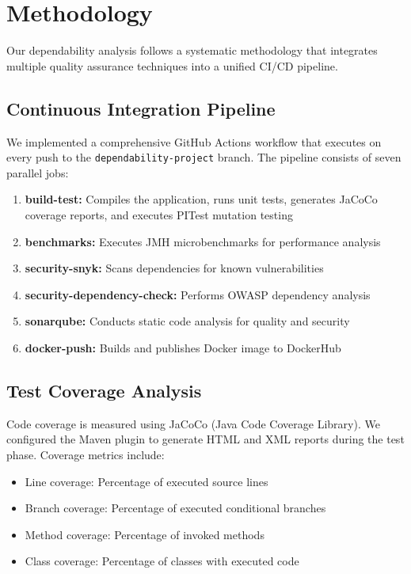 \documentclass[sigconf]{acmart}
\begin{document}
\section{Methodology}

Our dependability analysis follows a systematic methodology that integrates multiple quality assurance techniques into a unified CI/CD pipeline.

\subsection{Continuous Integration Pipeline}

We implemented a comprehensive GitHub Actions workflow that executes on every push to the \texttt{dependability-project} branch. The pipeline consists of seven parallel jobs:

\begin{enumerate}
    \item \textbf{build-test:} Compiles the application, runs unit tests, generates JaCoCo coverage reports, and executes PITest mutation testing
    \item \textbf{benchmarks:} Executes JMH microbenchmarks for performance analysis
    \item \textbf{security-snyk:} Scans dependencies for known vulnerabilities
    \item \textbf{security-dependency-check:} Performs OWASP dependency analysis
    \item \textbf{sonarqube:} Conducts static code analysis for quality and security
    \item \textbf{docker-push:} Builds and publishes Docker image to DockerHub
\end{enumerate}

\subsection{Test Coverage Analysis}

Code coverage is measured using JaCoCo (Java Code Coverage Library). We configured the Maven plugin to generate HTML and XML reports during the test phase. Coverage metrics include:
\begin{itemize}
    \item Line coverage: Percentage of executed source lines
    \item Branch coverage: Percentage of executed conditional branches
    \item Method coverage: Percentage of invoked methods
    \item Class coverage: Percentage of classes with executed code
\end{itemize}
\end{document}
